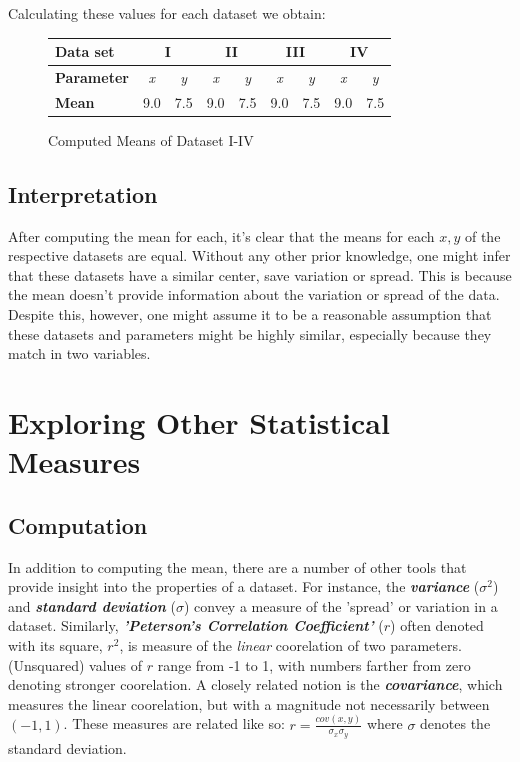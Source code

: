 \documentclass[11pt,a4paper]{article}
\begin{document}
Calculating these values for each dataset we obtain:

\begin{figure}[ht]
\centering
\begin{tabular}{|l|cc|cc|cc|cc|}
\hline
\textbf{Data set}         & \multicolumn{2}{c|}{\textbf{I}}              & \multicolumn{2}{c|}{\textbf{II}}             & \multicolumn{2}{c|}{\textbf{III}}            & \multicolumn{2}{c|}{\textbf{IV}}             \\ \hline
\textbf{Parameter} & \multicolumn{1}{c|}{\textit{x}} & \textit{y} & \multicolumn{1}{c|}{\textit{x}} & \textit{y} & \multicolumn{1}{c|}{\textit{x}} & \textit{y} & \multicolumn{1}{c|}{\textit{x}} & \textit{y} \\ \hline
\textbf{Mean}     & \multicolumn{1}{c|}{9.0}        & 7.5        & \multicolumn{1}{c|}{9.0}        & 7.5        & \multicolumn{1}{c|}{9.0}        & 7.5        & \multicolumn{1}{c|}{9.0}        & 7.5        \\ \hline
\end{tabular}
\caption{Computed Means of Dataset I-IV}
\end{figure}

\subsection{Interpretation}

After computing the mean for each, it's clear that the means for each $x, y$ of the respective datasets are equal. Without any other prior knowledge, one might infer that these datasets have a similar center, save variation or spread. This is because the mean doesn't provide information about the variation or spread of the data. Despite this, however, one might assume it to be a reasonable assumption that these datasets and parameters might be highly similar, especially because they match in two variables.

\section{Exploring Other Statistical Measures}
\subsection{Computation}

In addition to computing the mean, there are a number of other tools that provide insight into the properties of a dataset. For instance, the \textbf{\textit{variance}} ($\sigma^2$) and \textbf{\textit{standard deviation}} ($\sigma$) convey a measure of the 'spread' or variation in a dataset. Similarly, \textbf{\textit{'Peterson's Correlation Coefficient'}} ($r$) often denoted with its square, $r^2$, is measure of the \textit{linear} coorelation of two parameters. (Unsquared) values of $r$ range from -1 to 1, with numbers farther from zero denoting stronger coorelation. A closely related notion is the \textbf{\textit{covariance}}, which measures the linear coorelation, but with a magnitude not necessarily between $(-1, 1)$. These measures are related like so: $r = \frac{cov(x, y)}{\sigma_x \sigma_y}$ where $\sigma$ denotes the standard deviation.
\end{document}
